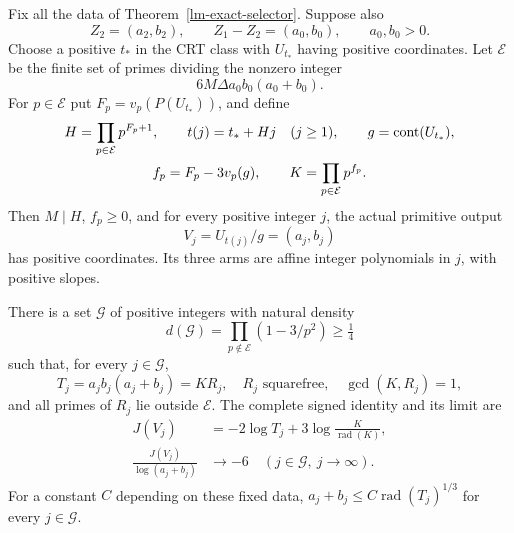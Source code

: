\begin{theorem}
\label{lm-paid-affine-family}
Fix all the data of Theorem~\ref{lm-exact-selector}. Suppose also
\[
 Z_2=(a_2,b_2),\qquad Z_1-Z_2=(a_0,b_0),\qquad a_0,b_0>0.
\]
Choose a positive \(t_*\) in the CRT class with \(U_{t_*}\) having
positive coordinates. Let \(\mathcal E\) be the finite set of primes
dividing the nonzero integer
\[
 6M\Delta a_0b_0(a_0+b_0).
\]
For \(p\in\mathcal E\) put \(F_p=v_p(P(U_{t_*}))\), and define
\begin{gather}
 H=\prod_{p\in\mathcal E}p^{F_p+1},\qquad
 t(j)=t_*+Hj\quad(j\ge1),\qquad g=\operatorname{cont}(U_{t_*}),
 \notag\\
 f_p=F_p-3v_p(g),\qquad
 K=\prod_{p\in\mathcal E}p^{f_p}.
 \label{lm-frozen-data}
\end{gather}
Then \(M\mid H\), \(f_p\ge0\), and for every positive integer \(j\),
the actual primitive output
\[
 V_j=U_{t(j)}/g=(a_j,b_j)
\]
has positive coordinates. Its three arms are affine integer
polynomials in \(j\), with positive slopes.

There is a set \(\mathcal G\) of positive integers with natural density
\begin{equation}
 d(\mathcal G)=\prod_{p\notin\mathcal E}(1-3/p^2)\ge\tfrac14
 \label{lm-positive-density}
\end{equation}
such that, for every \(j\in\mathcal G\),
\begin{equation}
 T_j=a_jb_j(a_j+b_j)=K R_j,
 \quad R_j\text{ squarefree},\quad \gcd(K,R_j)=1,
 \label{lm-full-squarefree-support}
\end{equation}
and all primes of \(R_j\) lie outside \(\mathcal E\). The complete
signed identity and its limit are
\begin{align}
 J(V_j)&=-2\log T_j+3\log\frac{K}{\operatorname{rad}(K)},
 \label{lm-full-signed-identity}\\
 \frac{J(V_j)}{\log(a_j+b_j)}&\longrightarrow-6
       \quad(j\in\mathcal G,\ j\to\infty).
 \label{lm-signed-limit}
\end{align}
For a constant \(C\) depending on these fixed data,
\(a_j+b_j\le C\operatorname{rad}(T_j)^{1/3}\) for every
\(j\in\mathcal G\).
\end{theorem}
